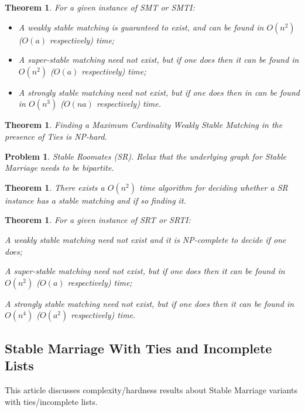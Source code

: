 \documentclass{article}
\newtheorem{theorem}[fact]{Theorem}
\newtheorem{problem}[fact]{Problem}
\begin{document}
\begin{theorem}
For a given instance of SMT or SMTI:
\begin{itemize}
\item A weakly stable matching is guaranteed to exist, and can be found in $O(n^2)$ ($O(a)$ respectively) time;
\item A super-stable matching need not exist, but if one does then it can be found in $O(n^2)$ ($O(a)$ respectively) time;
\item A strongly stable matching need not exist, but if one does then in can be found in $O(n^3)$ ($O(na)$ respectively) time.
\end{itemize}
\end{theorem}
\begin{theorem}
Finding a Maximum Cardinality Weakly Stable Matching in the presence of Ties is NP-hard.
\end{theorem}
\begin{problem}
Stable Roomates (SR). Relax that the underlying graph for Stable Marriage needs to be bipartite.
\end{problem}
\begin{theorem}
There exists a $O(n^2)$ time algorithm for deciding whether a SR instance has a stable matching and if so finding it.
\end{theorem}
\begin{theorem}
For a given instance of SRT or SRTI:
\item A weakly stable matching need not exist and it is NP-complete to decide if one does;
\item A super-stable matching need not exist, but if one does then it can be found in $O(n^2)$ ($O(a)$ respectively) time;
\item A strongly stable matching need not exist, but if one does then it can be found in $O(n^4)$ ($O(a^2)$ respectively) time.
\end{theorem}

\subsection{Stable Marriage With Ties and Incomplete Lists}

This article \cite{iwama2008stable} discusses complexity/hardness results about Stable Marriage variants with ties/incomplete lists.
\end{document}
